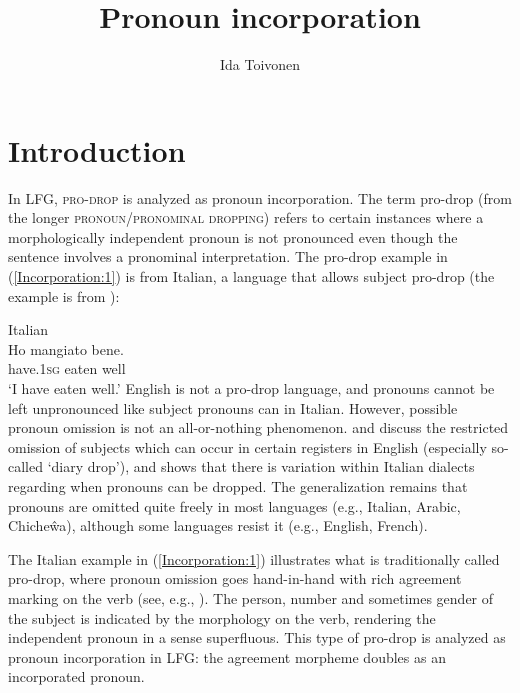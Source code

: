 \documentclass[output=paper,hidelinks]{langscibook}
\title{Pronoun incorporation}
\author{Ida Toivonen\affiliation{Carleton University}}
\begin{document}
\maketitle
\label{chap:Incorporation}

\section{Introduction}


In LFG, \textsc{pro-drop}   is analyzed as pronoun incorporation.  The term   pro-drop    (from the longer \textsc{pronoun/pronominal dropping})   refers  to  certain instances where  a morphologically independent  pronoun  is  not pronounced even though the sentence involves a pronominal interpretation.  The pro-drop example in    (\ref{Incorporation:1}) is  from  Italian,  a language that allows subject pro-drop     (the example is  from \citealt[92]{Burzio1986}):

\ea \label{Incorporation:1} Italian\\
\gll Ho  mangiato bene.  \\
  have.1\textsc{sg} eaten well   \\
\glt `I  have  eaten well.'
\z
 English  is not  a pro-drop language, and  pronouns cannot be left  unpronounced   like subject pronouns can in Italian. 
However, possible pronoun omission is not an all-or-nothing phenomenon. \citet{haegeman90}  and \citet{weir08}  discuss  the restricted    omission  of  subjects which  can occur in  certain registers in  English (especially so-called  `diary  drop'), and   \citet{cardinaletti14} shows  that there is variation within Italian dialects regarding  when   pronouns  can be dropped.   The generalization   remains  that   pronouns   are  omitted quite freely  in  most languages (e.g., Italian,  Arabic, Chiche\^{w}a), although  some languages resist it (e.g., English, French). 
 
\hspace*{-1.5mm}The  Italian example in (\ref{Incorporation:1}) illustrates what is  traditionally called pro-drop,  where pronoun omission   goes hand-in-hand with  rich agreement marking on the  verb (see, e.g., \citealt{chomsky1981lectures}).  The   person, number and sometimes gender of  the  subject  is   indicated by the  morphology  on the verb,   rendering the   independent  pronoun in  a sense superfluous.   This  type of pro-drop is analyzed as pronoun incorporation in LFG: the agreement morpheme doubles as an incorporated pronoun.
 
\end{document}
